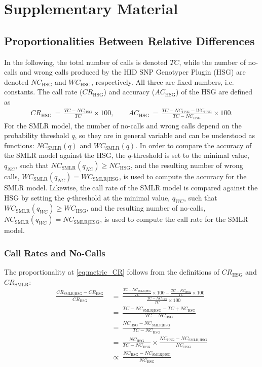 \documentclass[preprint,5p,times,11pt]{elsarticle}
\begin{document}
\section*{Supplementary Material}

\subsection*{Proportionalities Between Relative Differences}
In the following, the total number of calls is denoted $TC$, while the number of no-calls and wrong calls produced by the HID SNP Genotyper Plugin (HSG) are denoted $NC_{\text{HSG}}$ and $WC_{\text{HSG}}$, respectively.
All three are fixed numbers, i.e. constants.
The call rate ($CR_{\text{HSG}}$) and accuracy ($AC_{\text{HSG}}$) of the HSG are defined as
\begin{align*}
CR_{\text{HSG}} \, = \, \frac{TC - NC_{\text{HSG}}}{TC} \times 100, \qquad
AC_{\text{HSG}} \, = \, \frac{TC - NC_{\text{HSG}} - WC_{\text{HSG}}}{TC - NC_{\text{HSG}}} \times 100.
\end{align*}
For the SMLR model, the number of no-calls and wrong calls depend on the probability threshold $q$, so they are in general variable and can be understood as functions: $NC_{\text{SMLR}}(q)$ and $WC_{\text{SMLR}}(q)$.
In order to compare the accuracy of the SMLR model against the HSG, the $q$-threshold is set to the minimal value, $q_{NC}$, such that $NC_{\text{SMLR}}(q_{NC}) \geq NC_{\text{HSG}}$, and the resulting number of wrong calls, $WC_{\text{SMLR}}(q_{NC}) = WC_{\text{SMLR}\mid\text{HSG}}$, is used to compute the accuracy for the SMLR model.
Likewise, the call rate of the SMLR model is compared against the HSG by setting the $q$-threshold at the minimal value, $q_{WC}$, such that $WC_{\text{SMLR}}(q_{WC}) \geq WC_{\text{HSG}}$, and the resulting number of no-calls, $NC_{\text{SMLR}}(q_{WC}) = NC_{\text{SMLR}\mid\text{HSG}}$, is used to compute the call rate for the SMLR model.

\subsubsection*{Call Rates and No-Calls}
The proportionality at \eqref{eq:metric_CR} follows from the definitions of $CR_{\text{HSG}}$ and $CR_{\text{SMLR}}$:
\begin{align}
\frac{CR_{\text{SMLR}\mid\text{HSG}} - CR_{\text{HSG}}}{CR_{\text{HSG}}}
\ &= \ 
\frac{\frac{TC - NC_{\text{SMLR}\mid\text{HSG}}}{TC} \times 100 - \frac{TC - NC_{\text{HSG}}}{TC} \times 100}{\frac{TC - NC_{\text{HSG}}}{TC} \times 100} \nonumber\\
&= \ 
\frac{TC - NC_{\text{SMLR}\mid\text{HSG}} - TC + NC_{\text{HSG}}}{TC - NC_{\text{HSG}}} \nonumber\\
&= \ 
\frac{NC_{\text{HSG}} - NC_{\text{SMLR}\mid\text{HSG}}}{TC - NC_{\text{HSG}}} \nonumber\\
&= \ 
\frac{NC_{\text{HSG}}}{TC - NC_{\text{HSG}}} \times \frac{NC_{\text{HSG}} - NC_{\text{SMLR}\mid\text{HSG}}}{NC_{\text{HSG}}} \nonumber\\
\; &\propto \; 
\frac{NC_{\text{HSG}} - NC_{\text{SMLR}\mid\text{HSG}}}{NC_{\text{HSG}}}\label{eq:prop_CR}
\end{align}
\end{document}
